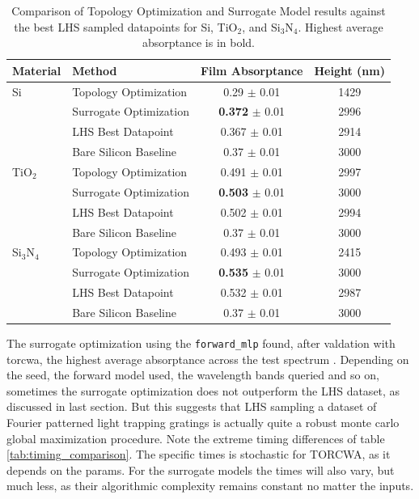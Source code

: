 \begin{table}[htbp]
\centering
\caption{Comparison of Topology Optimization and Surrogate Model results against the best LHS sampled datapoints for Si, TiO$_2$, and Si$_3$N$_4$. Highest average absorptance is in bold.}
\label{tab:opt_vs_lhs_vs_surr}
\begin{tabular}{@{}llcc@{}}
\toprule
\textbf{Material} & \textbf{Method} & \textbf{Film Absorptance} & \textbf{Height (nm)} \\
\midrule
Si & Topology Optimization & 0.29 $\pm$ 0.01 & 1429 \\
 & Surrogate Optimization & \textbf{0.372} $\pm$ 0.01 & 2996  \\
 & LHS Best Datapoint & 0.367 $\pm$ 0.01 & 2914 \\
 & Bare Silicon Baseline & 0.37 $\pm$ 0.01 & 3000  \\
\midrule
TiO$_2$ & Topology Optimization & 0.491 $\pm$ 0.01 & 2997  \\
 & Surrogate Optimization & \textbf{0.503} $\pm$ 0.01 & 3000 \\
 & LHS Best Datapoint & 0.502 $\pm$ 0.01 & 2994  \\
 & Bare Silicon Baseline & 0.37 $\pm$ 0.01 & 3000  \\
\midrule
Si$_3$N$_4$ & Topology Optimization & 0.493 $\pm$ 0.01 & 2415  \\
 & Surrogate Optimization & \textbf{0.535} $\pm$ 0.01 & 3000 \\
 & LHS Best Datapoint & 0.532 $\pm$ 0.01 & 2987  \\
 & Bare Silicon Baseline & 0.37 $\pm$ 0.01 & 3000  \\
\bottomrule
\end{tabular}
\end{table}
The surrogate optimization using the \texttt{forward\_mlp} found, after valdation with torcwa, the highest average absorptance across the test spectrum . Depending on the seed, the forward model used, the wavelength bands queried and so on, sometimes the surrogate optimization does not outperform the LHS dataset, as discussed in last section. But this suggests that LHS sampling a dataset of Fourier patterned light trapping gratings is actually quite a robust monte carlo global maximization procedure.
Note the extreme timing differences of table \ref{tab:timing_comparison}. The specific times is stochastic for TORCWA, as it depends on the params. For the surrogate models the times will also vary, but much less, as their algorithmic complexity remains constant no matter the inputs.
